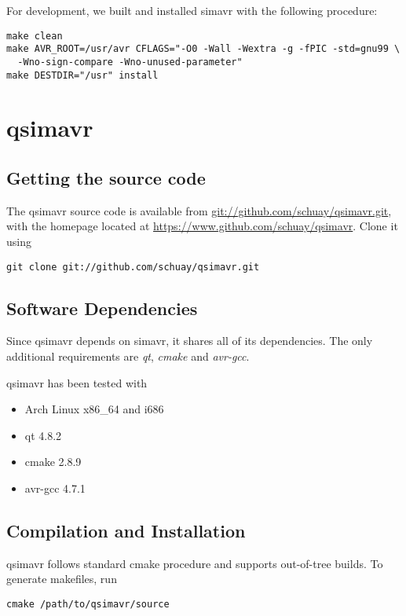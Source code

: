 For development, we built and installed simavr with the following procedure:

\begin{verbatim}
make clean
make AVR_ROOT=/usr/avr CFLAGS="-O0 -Wall -Wextra -g -fPIC -std=gnu99 \
  -Wno-sign-compare -Wno-unused-parameter"
make DESTDIR="/usr" install
\end{verbatim}

\section{qsimavr}

\subsection{Getting the source code}

The qsimavr source code is available from
\url{git://github.com/schuay/qsimavr.git}, with the homepage located at
\url{https://www.github.com/schuay/qsimavr}. Clone it using

\begin{verbatim}
git clone git://github.com/schuay/qsimavr.git
\end{verbatim}

\subsection{Software Dependencies}

Since qsimavr depends on simavr, it shares all of its dependencies. The only
additional requirements are \emph{qt}, \emph{cmake} and \emph{avr-gcc}.

qsimavr has been tested with

\begin{itemize}
\item Arch Linux x86\_64 and i686
\item qt 4.8.2
\item cmake 2.8.9
\item avr-gcc 4.7.1
\end{itemize}

\subsection{Compilation and Installation}

qsimavr follows standard cmake procedure and supports out-of-tree builds. To
generate makefiles, run

\begin{verbatim}
cmake /path/to/qsimavr/source
\end{verbatim}

